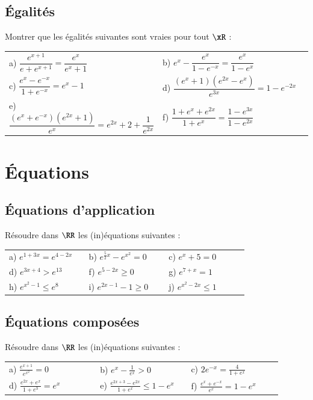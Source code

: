 \documentclass[oneside,12pt]{article}          %
\begin{document}
\subsection{Égalités}
Montrer que les égalités suivantes sont vraies pour tout $\xR$ :

\renewcommand{\arraystretch}{2.4}
\begin{tabular}{p{0.5\linewidth} p{0.5\linewidth}}\large
    a) $\dfrac{e^{x+1}}{e+e^{x+1}}=\dfrac{e^x}{e^x+1}$ &
    b) $e^x-\dfrac{e^x}{1-e^{-x}}=\dfrac{e^x}{1-e^x}$ \\
    c) $\dfrac{e^x-e^{-x}}{1+e^{-x}}=e^x-1$ &
    d) $\dfrac{(e^{x}+1)(e^{2x}-e^x)}{e^{3x}}=1-e^{-2x} $\\
    e) $\dfrac{(e^{x}+e^{-x})(e^{2x}+1)}{e^{x}}=e^{2x}+2+\dfrac{1}{e^{2x}}$ &
    f) $\dfrac{1+e^{x}+e^{2x}}{1+e^{x}}=\dfrac{1-e^{3x}}{1-e^{2x}}$
\end{tabular}



\section{Équations}

\subsection{Équations d'application}
Résoudre dans $\RR$ les (in)équations suivantes :

\renewcommand{\arraystretch}{1.3}
\begin{tabular}{p{0.3\linewidth}p{0.3\linewidth}p{0.3\linewidth}}
    a) $e^{1+3x} = e^{4-2x}$ & b) $e^{\frac{5}{2}x} - e^{x^2} = 0$ & c) $e^x + 5 = 0$ \\
    d) $e^{3x+4} > e^{13}$ & f) $e^{5-2x} \geq 0$ & g) $e^{7+x} = 1$ \\
    h) $e^{x^2-1} \leq e^8$ & i) $e^{2x-1} - 1 \geq 0$ & j) $e^{x^2 - 2x} \leq 1$
\end{tabular}



\subsection{Équations composées}
Résoudre dans $\RR$ les (in)équations suivantes :

\renewcommand{\arraystretch}{1.5}
\begin{tabular}{p{0.3\linewidth}p{0.3\linewidth}p{0.3\linewidth}}
    a) $\frac{e^{x+1}}{e^{x^2}} = 0$ & b) $e^x-\frac{1}{e^x} > 0$ & c) $2e^{-x}=\frac{4}{1 + e^x}$\\
    d) $\frac{e^{2x} + e^x}{1 + e^3} = e^x$ & e) $\frac{e^{2x+3} - e^{2x}}{1 + e^x} \leq 1 - e^x$ & f) $\frac{e^x + e^{-x}}{e^x} = 1 - e^x$ \\
\end{tabular}
\end{document}
